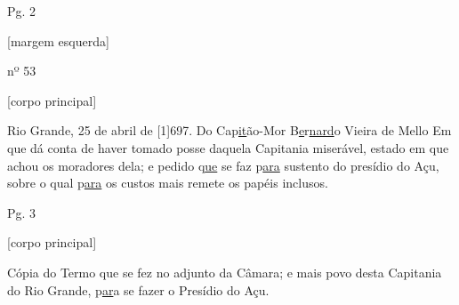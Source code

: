 \begin{refsection}

    \vspace{5mm}

    \noindent{}Pg. 2 

    \vspace{1ex}

    \noindent{}[margem esquerda]

    \vspace{1ex}

    nº 53 
    
    \vspace{1ex}

    \noindent{}[corpo principal] 

    \vspace{1ex}

    Rio Grande, 25 de abril de [1]697. Do Cap\underline{it}ão-Mor B\underline{e}r\underline{nard}o Vieira de Mello Em que dá conta de haver tomado posse daquela Capitania miserável, estado em que achou os moradores dela; e pedido q\underline{ue} se faz p\underline{ara} sustento do presídio do Açu, sobre o qual p\underline{ara} os custos mais remete os papéis inclusos. 


    \vspace{5mm}

    \noindent{}Pg. 3

    \vspace{1ex}

    \noindent{}[corpo principal] 

    \vspace{1ex}

    Cópia do Termo que se fez no adjunto da Câmara; e mais povo desta Capitania do Rio Grande, p\underline{ar}a se fazer o Presídio do Açu.  


\end{refsection}

